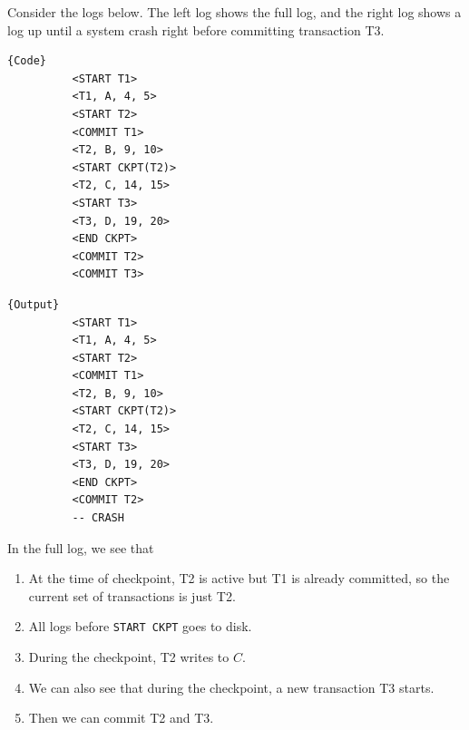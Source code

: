     \begin{example}
      Consider the logs below. The left log shows the full log, and the right log shows a log up until a system crash right before committing transaction T3. 
      
      \noindent\begin{minipage}{.5\textwidth}
        \begin{lstlisting}[]{Code}
          <START T1>
          <T1, A, 4, 5>
          <START T2>
          <COMMIT T1>
          <T2, B, 9, 10>
          <START CKPT(T2)>
          <T2, C, 14, 15>
          <START T3>
          <T3, D, 19, 20>
          <END CKPT>
          <COMMIT T2>
          <COMMIT T3>
        \end{lstlisting}
        \end{minipage}
        \hfill
        \begin{minipage}{.49\textwidth}
        \begin{lstlisting}[]{Output}
          <START T1>
          <T1, A, 4, 5>
          <START T2>
          <COMMIT T1>
          <T2, B, 9, 10>
          <START CKPT(T2)>
          <T2, C, 14, 15>
          <START T3>
          <T3, D, 19, 20>
          <END CKPT>
          <COMMIT T2>
          -- CRASH
        \end{lstlisting}
      \end{minipage}

      In the full log, we see that 
      \begin{enumerate}
        \item At the time of checkpoint, T2 is active but T1 is already committed, so the current set of transactions is just T2. 
        \item All logs before \texttt{START CKPT} goes to disk. 
        \item During the checkpoint, T2 writes to $C$. 
        \item We can also see that during the checkpoint, a new transaction T3 starts. 
        \item Then we can commit T2 and T3. 
      \end{enumerate}


\end{example}
